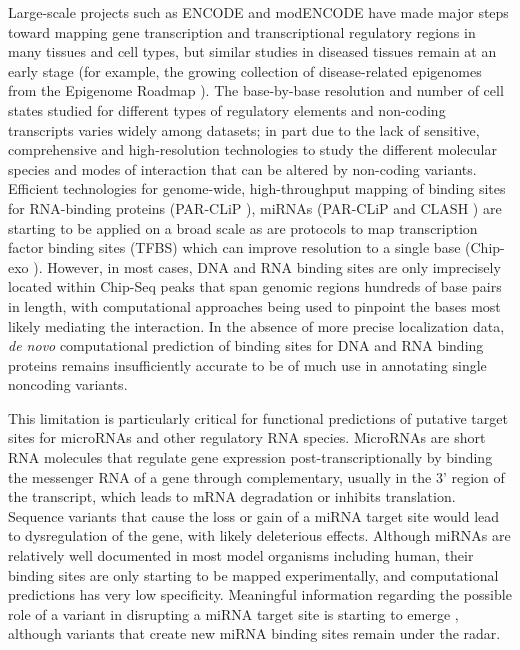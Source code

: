 Large-scale projects such as ENCODE \cite{encode2012integrated} and modENCODE \cite{celniker2009unlocking} have made major steps toward mapping gene transcription and transcriptional regulatory regions in many tissues and cell types, but similar studies in diseased tissues remain at an early stage (for example, the growing collection of disease-related epigenomes from the Epigenome Roadmap \cite{bernstein2010nih}). The base-by-base resolution and number of cell states studied for different types of regulatory elements and non-coding transcripts varies widely among datasets; in part due to the lack of sensitive, comprehensive and high-resolution technologies to study the different molecular species and modes of interaction that can be altered by non-coding variants. Efficient technologies for genome-wide, high-throughput mapping of binding sites for RNA-binding proteins (PAR-CLiP \cite{ascano2012identification}), miRNAs (PAR-CLiP \cite{hafner2012genome} and CLASH \cite{helwak2013mapping}) are starting to be applied on a broad scale as are protocols to map transcription factor binding sites (TFBS) which can improve resolution to a single base (Chip-exo \cite{rhee2012chip}). However, in most cases, DNA and RNA binding sites are only imprecisely located within Chip-Seq peaks that span genomic regions hundreds of base pairs in length, with computational approaches being used to pinpoint the bases most likely mediating the interaction. In the absence of more precise localization data, \textit{de novo} computational prediction of binding sites for DNA and RNA binding proteins remains insufficiently accurate to be of much use in annotating single noncoding variants.

This limitation is particularly critical for functional predictions of putative target sites for microRNAs and other regulatory RNA species. MicroRNAs are short RNA molecules that regulate gene expression post-transcriptionally by binding the messenger RNA of a gene through complementary, usually in the 3' region of the transcript, which leads to mRNA degradation or inhibits translation. Sequence variants that cause the loss or gain of a miRNA target site would lead to dysregulation of the gene, with likely deleterious effects. Although miRNAs are relatively well documented in most model organisms including human, their binding sites are only starting to be mapped experimentally, and computational predictions has very low specificity. Meaningful information regarding the possible role of a variant in disrupting a miRNA target site is starting to emerge \cite{liu2012mirsnp}, although variants that create new miRNA binding sites remain under the radar.

